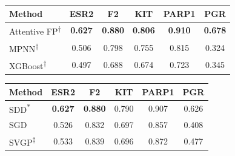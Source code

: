 \hfill
\begin{tabular}{l c c c c c}
\toprule
Method & \textsc{ESR2} & \textsc{F2} & \textsc{KIT} & \textsc{PARP1} & \textsc{PGR} \\
\midrule
Attentive FP\textsuperscript{\ensuremath{\dagger}}      & \textbf{0.627} & \textbf{0.880} & \textbf{0.806} & \textbf{0.910} & \textbf{0.678} \\
MPNN\textsuperscript{\ensuremath{\dagger}}              & 0.506 & 0.798 & 0.755 & 0.815 & 0.324 \\
XGBoost\textsuperscript{\ensuremath{\dagger}}             & 0.497 & 0.688 & 0.674 & 0.723 & 0.345 \\
\bottomrule
\end{tabular}
\hfill
\begin{tabular}{l c c c c c}
\toprule
Method & \textsc{ESR2} & \textsc{F2} & \textsc{KIT} & \textsc{PARP1} & \textsc{PGR} \\
\midrule
SDD\textsuperscript{\ensuremath{*}}             & \textbf{0.627} & \textbf{0.880} & 0.790 & 0.907 & 0.626 \\
SGD               & 0.526 & 0.832 & 0.697 & 0.857 & 0.408 \\
SVGP\textsuperscript{\ensuremath{\ddagger}}     & 0.533 & 0.839 & 0.696 & 0.872 & 0.477 \\ 
\bottomrule
\end{tabular}
\hfill